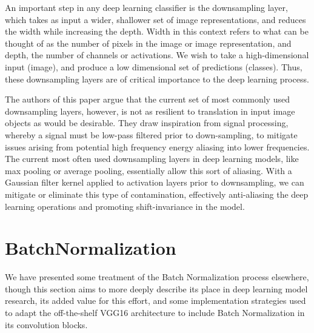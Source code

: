 An important step in any deep learning classifier is the downsampling layer, which takes as input a wider, shallower set of image representations, and reduces the width while increasing the depth.
Width in this context refers to what can be thought of as the number of pixels in the image or image representation, and depth, the number of channels or activations.
We wish to take a high-dimensional input (image), and produce a low dimensional set of predictions (classes).
Thus, these downsampling layers are of critical importance to the deep learning process.

The authors of this paper argue that the current set of most commonly used downsampling layers, however, is not as resilient to translation in input image objects as would be desirable.
They draw inspiration from signal processing, whereby a signal must be low-pass filtered prior to down-sampling, to mitigate issues arising from potential high frequency energy aliasing into lower frequencies.
The current most often used downsampling layers in deep learning models, like max pooling or average pooling, essentially allow this sort of aliasing.
With a Gaussian filter kernel applied to activation layers prior to  downsampling, we can mitigate or eliminate this type of contamination, effectively anti-aliasing the deep learning operations and promoting shift-invariance in the model.

\section{BatchNormalization}
\label{sec:bestmodel_batchnorm}

We have presented some treatment of the Batch Normalization process elsewhere, though this section aims to more deeply describe its place in deep learning model research, its added value for this effort, and some implementation strategies used to adapt the off-the-shelf VGG16 architecture to include Batch Normalization in its convolution blocks.

